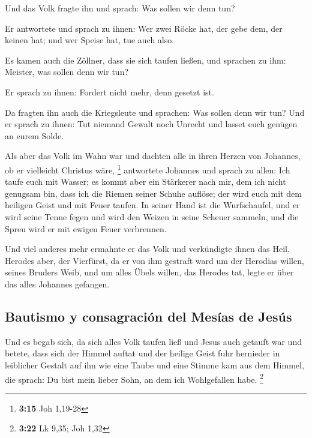  Und das Volk fragte ihn und sprach: Was sollen wir denn
tun?

 Er antwortete und sprach zu ihnen: Wer zwei Röcke hat,
der gebe dem, der keinen hat; und wer Speise hat, tue auch also.

 Es kamen auch die Zöllner, dass sie sich taufen ließen,
und sprachen zu ihm: Meister, was sollen denn wir tun?

 Er sprach zu ihnen: Fordert nicht mehr, denn gesetzt
ist.

 Da fragten ihn auch die Kriegsleute und sprachen: Was
sollen denn wir tun? Und er sprach zu ihnen: Tut niemand Gewalt noch
Unrecht und lasset euch genügen an eurem Solde.

 Als aber das Volk im Wahn war und dachten alle in ihren
Herzen von Johannes, ob er vielleicht Christus wäre, \footnote{\textbf{3:15}
  Joh 1,19-28}  antwortete Johannes und sprach zu allen:
Ich taufe euch mit Wasser; es kommt aber ein Stärkerer nach mir, dem ich
nicht genugsam bin, dass ich die Riemen seiner Schuhe auflöse; der wird
euch mit dem heiligen Geist und mit Feuer taufen.  In
seiner Hand ist die Wurfschaufel, und er wird seine Tenne fegen und wird
den Weizen in seine Scheuer sammeln, und die Spreu wird er mit ewigen
Feuer verbrennen.

 Und viel anderes mehr ermahnte er das Volk und
verkündigte ihnen das Heil.  Herodes aber, der Vierfürst,
da er von ihm gestraft ward um der Herodias willen, seines Bruders Weib,
und um alles Übels willen, das Herodes tat,  legte er
über das alles Johannes gefangen.

\hypertarget{bautismo-y-consagraciuxf3n-del-mesuxedas-de-jesuxfas}{%
\subsection{Bautismo y consagración del Mesías de
Jesús}\label{bautismo-y-consagraciuxf3n-del-mesuxedas-de-jesuxfas}}

 Und es begab sich, da sich alles Volk taufen ließ und
Jesus auch getauft war und betete, dass sich der Himmel auftat
 und der heilige Geist fuhr hernieder in leiblicher
Gestalt auf ihn wie eine Taube und eine Stimme kam aus dem Himmel, die
sprach: Du bist mein lieber Sohn, an dem ich Wohlgefallen habe.
\footnote{\textbf{3:22} Lk 9,35; Joh 1,32}

